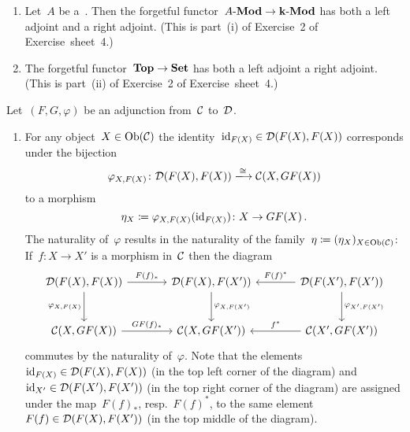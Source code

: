 \begin{example*}
  \leavevmode
  \begin{enumerate}
    \item
      Let~$A$ be a~{\kalg}.
      Then the forgetful functor~$\text{$A$-$\mathbf{Mod}$} \to \text{$\mathbf{k}$-$\mathbf{Mod}$}$ has both a left adjoint and a right adjoint.
      (This is part~(i) of Exercise~2 of Exercise~sheet~4.)
    \item
      The forgetful functor~$\mathbf{Top} \to \mathbf{Set}$ has both a left adjoint a right adjoint.
      (This is part~(ii) of Exercise~2 of Exercise~sheet~4.)
  \end{enumerate}
\end{example*}


\begin{remark}[label = triangle equalities]
  Let~$(F,G,\varphi)$ be an adjunction from~$\mathcal{C}$ to~$\mathcal{D}$.
  \begin{enumerate}
    \item
      For any object~$X \in \operatorname{Ob}(\mathcal{C})$ the identity~$\operatorname{id}_{F(X)} \in \mathcal{D}(F(X), F(X))$ corresponds under the bijection
      \[
                        \varphi_{X,F(X)}
        \colon          \Dcat(F(X), F(X))
        \xlongto{\cong} \Ccat(X, GF(X))
      \]
      to a morphism
      \[
                  \eta_X
        \coloneqq  \varphi_{X,F(X)}(\operatorname{id}_{F(X)})
        \colon    X
        \to       GF(X) \,.
      \]
      The naturality of~$\varphi$ results in the naturality of the family~$\eta \coloneqq (\eta_X)_{X \in \operatorname{Ob}(\mathcal{C})}$:
      If~$f \colon X \to X'$ is a morphism in~$\mathcal{C}$ then the diagram
      \begin{equation}
        \label{big diagram}
        \begin{tikzcd}[sep = large]
            \Dcat(F(X), F(X))
            \arrow{r}[above]{F(f)_*}
            \arrow{d}[left]{\varphi_{X,F(X)}}
          & \Dcat(F(X), F(X'))
            \arrow{d}{\varphi_{X,F(X')}}
          & \Dcat(F(X'), F(X'))
            \arrow{l}[above]{F(f)^*}
            \arrow{d}[right]{\varphi_{X',F(X')}}
          \\
            \Ccat(X, GF(X))
            \arrow{r}[above]{GF(f)_*}
          & \Ccat(X, GF(X'))
          & \Ccat(X', GF(X'))
            \arrow{l}[above]{f^*}
        \end{tikzcd}
      \end{equation}
      commutes by the naturality of~$\varphi$.
      Note that the elements~$\operatorname{id}_{F(X)} \in \mathcal{D}(F(X), F(X))$ (in the top left corner of the diagram) and~$\operatorname{id}_{X'} \in \mathcal{D}(F(X'), F(X'))$ (in the top right corner of the diagram) are assigned under the map~$F(f)_*$, resp.~$F(f)^*$, to the same element~$F(f) \in \mathcal{D}(F(X), F(X'))$ (in the top middle of the diagram).

\end{enumerate}
\end{remark}
